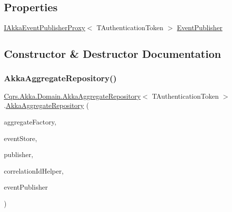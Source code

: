 \subsection*{Properties}
\begin{DoxyCompactItemize}
\item 
\hyperlink{interfaceCqrs_1_1Akka_1_1Events_1_1IAkkaEventPublisherProxy}{I\+Akka\+Event\+Publisher\+Proxy}$<$ T\+Authentication\+Token $>$ \hyperlink{classCqrs_1_1Akka_1_1Domain_1_1AkkaAggregateRepository_a6c6400aef33fd3ec5dc3e479ebec6b40}{Event\+Publisher}
\end{DoxyCompactItemize}


\subsection{Constructor \& Destructor Documentation}
\mbox{\label{classCqrs_1_1Akka_1_1Domain_1_1AkkaAggregateRepository_afc997ba5187ca08d3f81a0c204eda3a2}} 
\subsubsection{\texorpdfstring{Akka\+Aggregate\+Repository()}{AkkaAggregateRepository()}}
{\footnotesize\ttfamily \hyperlink{classCqrs_1_1Akka_1_1Domain_1_1AkkaAggregateRepository}{Cqrs.\+Akka.\+Domain.\+Akka\+Aggregate\+Repository}$<$ T\+Authentication\+Token $>$.\hyperlink{classCqrs_1_1Akka_1_1Domain_1_1AkkaAggregateRepository}{Akka\+Aggregate\+Repository} (\begin{DoxyParamCaption}\item[{\hyperlink{interfaceCqrs_1_1Domain_1_1Factories_1_1IAggregateFactory}{I\+Aggregate\+Factory}}]{aggregate\+Factory,  }\item[{\hyperlink{interfaceCqrs_1_1Events_1_1IEventStore}{I\+Event\+Store}$<$ T\+Authentication\+Token $>$}]{event\+Store,  }\item[{\hyperlink{interfaceCqrs_1_1Events_1_1IEventPublisher}{I\+Event\+Publisher}$<$ T\+Authentication\+Token $>$}]{publisher,  }\item[{I\+Correlation\+Id\+Helper}]{correlation\+Id\+Helper,  }\item[{\hyperlink{interfaceCqrs_1_1Akka_1_1Events_1_1IAkkaEventPublisherProxy}{I\+Akka\+Event\+Publisher\+Proxy}$<$ T\+Authentication\+Token $>$}]{event\+Publisher }\end{DoxyParamCaption})}



